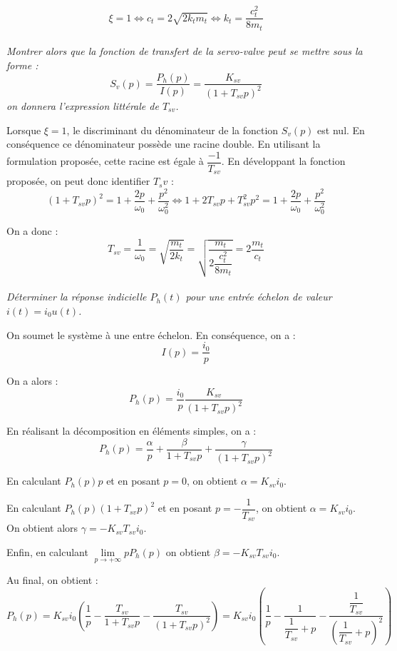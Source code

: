 \documentclass[10pt,oneside]{article}
\begin{document}
$$
\xi = 1 \Leftrightarrow  c_t = 2\sqrt{2k_t m_t} \Leftrightarrow  k_t =
\dfrac{c_t^2}{8 m_t}
$$

\paragraph{}
\textit{Montrer alors que la fonction de transfert de la servo-valve peut se mettre sous la forme :}
$$
S_v(p)=\dfrac{P_h (p)}{I(p)}=\dfrac{K_{sv}}{\left( 1+T_{sv} p\right)^2 }
$$
\textit{on donnera l'expression littérale de $T_{sv}$.}

Lorsque $\xi=1$, le discriminant du dénominateur de la fonction
$S_v(p)$ est nul. En conséquence ce dénominateur possède une racine double. En
utilisant la formulation proposée, cette racine est égale à
$\dfrac{-1}{T_{sv}}$. En développant la fonction proposée, on peut donc
identifier $T_sv$ :
$$
\left( 1+T_{sv} p\right)^2  = 1+\dfrac{2
p}{\omega_0}+\dfrac{p^2}{\omega_0^2}  \Leftrightarrow 1 + 2 T_{sv} p +T_{sv}^2
p^2 = 1+\dfrac{2
p}{\omega_0}+\dfrac{p^2}{\omega_0^2}   
$$

On a donc : 
$$
T_{sv}=\dfrac{1}{\omega_0} = \sqrt{\dfrac{m_t}{2k_t}} = \sqrt{\dfrac{m_t}{2
\dfrac{c_t^2}{8 m_t}}} = 2\dfrac{m_t}{c_t}
$$

\paragraph{}
\textit{Déterminer la réponse indicielle $P_h(t)$ pour une entrée échelon de valeur $i(t)=i_0 u(t)$.}

On soumet le système à une entre échelon. En conséquence, on a : 
$$
I(p)=\dfrac{i_0}{p}
$$

On a alors :
$$
P_h(p)=\dfrac{i_0}{p}\dfrac{K_{sv}}{\left(1+T_{sv}p\right)^2}
$$

En réalisant la décomposition en éléments simples, on a : 
$$
P_h(p)=\dfrac{\alpha}{p}+\dfrac{\beta}{1+T_{sv}p}+\dfrac{\gamma}{\left(1+T_{sv}
p\right)^2}
$$

En calculant $P_h(p)p$ et en posant $p=0$, on obtient $\alpha = K_{sv}i_0$.

En calculant $P_h(p)\left(1+T_{sv} p\right)^2$ et en posant
$p=-\dfrac{1}{T_{sv}}$, on obtient $\alpha = K_{sv}i_0$. On obtient alors
$\gamma = - K_{sv} T_{sv} i_0$.

Enfin, en calculant $\lim\limits_{p\to +\infty} p P_h(p)$ on obtient $\beta =
-K_{sv} T_{sv} i_0$.

Au final, on obtient : 
$$
P_h(p) = K_{sv} i_0 \left( \dfrac{1}{p} - \dfrac{T_{sv}}{1+T_{sv}p} -
\dfrac{T_{sv}}{\left(1+T_{sv}p\right)^2} \right) 
=
K_{sv} i_0
\left( 
\dfrac{1}{p}
-\dfrac{1}{\dfrac{1}{T_{sv}}+p}
-\dfrac{\dfrac{1}{T_{sv}}}{\left(\dfrac{1}{T_{sv}}+p\right)^2}
\right) 
$$
\end{document}
